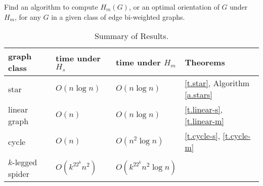 \begin{problem}
Find an algorithm to compute
$H_m(G) $, or an optimal orientation of $G$ under $H_m$,
for any $G$ in a given class of edge bi-weighted graphs.
\end{problem}

\begin{table*}[h!]
	\begin{center}
		\caption{Summary of Results.}
		\label{tbl:summary}
		\begin{tabular}{|l|l|l|l|}
			\hline
			graph class & time under $H_s$ & time under $H_m$  & Theorems  \\
			\hline
			star            &        $O(n \log n)$  & $O(n \log n)$        & \ref{t.star}, Algorithm \ref{a.stars}		\\
						\hline
			linear graph & $O(n)$        		&$O(n \log n)$ 	& \ref{t.linear-s}, \ref{t.linear-m} \\
						\hline
			cycle 		 & $O(n)$ 		& $O(n^2 \log n)$ 		&  \ref{t.cycle-s}, \ref{t.cycle-m} \\
									\hline
			$k$-legged spider 		 & $O(k^22^k n^2)$ 		& $O(k^22^kn^2 \log n)$ 		&   \\
			\hline
		\end{tabular}
	\end{center}
\end{table*}
